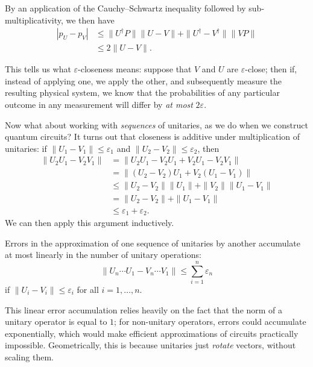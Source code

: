 \documentclass[fleqn]{article}
\newenvironment{idea}{\noindent}{\medskip}
\renewcommand{\footnote}[1]{\en{#1}}
\begin{document}
By an application of the Cauchy--Schwartz inequality\footnote{See Exercise \ref{operator-norm}.} followed by sub-multiplicativity, we then have
\[
  \begin{aligned}
    |p_U-p_V|
    &\leqslant\|U^\dagger P\|\|U-V\| + \|U^\dagger-V^\dagger\|\|VP\|
  \\&\leqslant 2\|U-V\|.
  \end{aligned}
\]

This tells us what \(\varepsilon\)-closeness means: suppose that \(V\) and \(U\) are \(\varepsilon\)-close; then if, instead of applying one, we apply the other, and subsequently measure the resulting physical system, we know that the probabilities of any particular outcome in any measurement will differ by \emph{at most} \(2\varepsilon\).

Now what about working with \emph{sequences} of unitaries, as we do when we construct quantum circuits?
It turns out that closeness is additive under multiplication of unitaries: if \(\|U_1-V_1\|\leqslant\varepsilon_1\) and \(\|U_2-V_2\|\leqslant\varepsilon_2\), then
\[
  \begin{aligned}
    \|U_2U_1 - V_2V_1\|
    &= \|U_2U_1 - V_2U_1 + V_2U_1 - V_2V_1\|
  \\&= \|(U_2-V_2)U_1 + V_2(U_1-V_1)\|
  \\&\leqslant\|U_2-V_2\|\|U_1\| + \|V_2\|\|U_1-V_1\|
  \\&= \|U_2-V_2\| + \|U_1-V_1\|
  \\&\leqslant\varepsilon_1+\varepsilon_2.
  \end{aligned}
\]
We can then apply this argument inductively.

\begin{idea}
Errors in the approximation of one sequence of unitaries by another accumulate at most linearly in the number of unitary operations:
\[
  \|U_n\cdots U_1 - V_n\cdots V_1\| \leqslant\sum_{i=1}^n \varepsilon_n
\]
if \(\|U_i-V_i\|\leqslant\varepsilon_i\) for all \(i=1,\ldots,n\).

\end{idea}

This linear error accumulation relies heavily on the fact that the norm of a unitary operator is equal to \(1\); for non-unitary operators, errors could accumulate exponentially, which would make efficient approximations of circuits practically impossible.
Geometrically, this is because unitaries just \emph{rotate} vectors, without scaling them.
\end{document}
